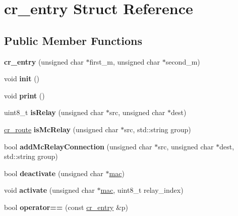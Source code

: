 \hypertarget{structcr__entry}{\section{cr\-\_\-entry Struct Reference}
\label{structcr__entry}
}
\subsection*{Public Member Functions}
\begin{DoxyCompactItemize}
\item 
\hypertarget{structcr__entry_ab16dc758a9f460c3ce97a3388b8e9e26}{{\bfseries cr\-\_\-entry} (unsigned char $\ast$first\-\_\-m, unsigned char $\ast$second\-\_\-m)}\label{structcr__entry_ab16dc758a9f460c3ce97a3388b8e9e26}

\item 
\hypertarget{structcr__entry_aea8e3782816931c7d4c030bab0116ae8}{void {\bfseries init} ()}\label{structcr__entry_aea8e3782816931c7d4c030bab0116ae8}

\item 
\hypertarget{structcr__entry_a56dce4149a80a30e551b7f3485e3a983}{void {\bfseries print} ()}\label{structcr__entry_a56dce4149a80a30e551b7f3485e3a983}

\item 
\hypertarget{structcr__entry_a440f370c3f8f6e3157de33cf80a56cbf}{uint8\-\_\-t {\bfseries is\-Relay} (unsigned char $\ast$src, unsigned char $\ast$dest)}\label{structcr__entry_a440f370c3f8f6e3157de33cf80a56cbf}

\item 
\hypertarget{structcr__entry_ab749925735267c3b1d3767d10d3d0ca9}{\hyperlink{structcr__route}{cr\-\_\-route} {\bfseries is\-Mc\-Relay} (unsigned char $\ast$src, std\-::string group)}\label{structcr__entry_ab749925735267c3b1d3767d10d3d0ca9}

\item 
\hypertarget{structcr__entry_afb69e7b268b74c6d0a53d8783344a02b}{bool {\bfseries add\-Mc\-Relay\-Connection} (unsigned char $\ast$src, unsigned char $\ast$dest, std\-::string group)}\label{structcr__entry_afb69e7b268b74c6d0a53d8783344a02b}

\item 
\hypertarget{structcr__entry_a5ab654355cbe24fce3e592fcd81a1db9}{bool {\bfseries deactivate} (unsigned char $\ast$\hyperlink{structmac}{mac})}\label{structcr__entry_a5ab654355cbe24fce3e592fcd81a1db9}

\item 
\hypertarget{structcr__entry_ad792c519087718383d17a68bd9bdfe9f}{void {\bfseries activate} (unsigned char $\ast$\hyperlink{structmac}{mac}, uint8\-\_\-t relay\-\_\-index)}\label{structcr__entry_ad792c519087718383d17a68bd9bdfe9f}

\item 
\hypertarget{structcr__entry_a1007ed9a5e41202d25e99fe857075f5c}{bool {\bfseries operator==} (const \hyperlink{structcr__entry}{cr\-\_\-entry} \&p)}\label{structcr__entry_a1007ed9a5e41202d25e99fe857075f5c}

\end{DoxyCompactItemize}
